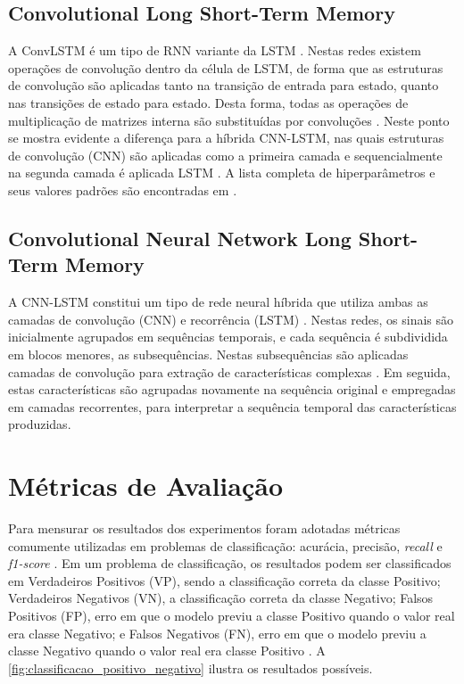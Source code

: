 \subsection{Convolutional Long Short-Term Memory}

A ConvLSTM é um tipo de RNN variante da LSTM \cite{Salman2018}. Nestas redes existem operações de convolução dentro da célula de LSTM, de forma que as estruturas de convolução são aplicadas tanto na transição de entrada para estado, quanto nas transições de estado para estado. Desta forma, todas as operações de multiplicação de matrizes interna são substituídas por convoluções \cite{Rahman2019}. Neste ponto se mostra evidente a diferença para a híbrida CNN-LSTM, nas quais estruturas de convolução (CNN) são aplicadas como a primeira camada e sequencialmente na segunda camada é aplicada LSTM \cite{Rahman2019}. A lista completa de hiperparâmetros e seus valores padrões são encontradas em .

\subsection{Convolutional Neural Network Long Short-Term Memory}

A CNN-LSTM constitui um tipo de rede neural híbrida que utiliza ambas as camadas de convolução (CNN) e recorrência (LSTM) \cite{Deep2019}. Nestas redes, os sinais são inicialmente agrupados em sequências temporais, e cada sequência é subdividida em blocos menores, as subsequências. Nestas subsequências são aplicadas camadas de convolução para extração de características complexas \cite{Deep2019}. Em seguida, estas características são agrupadas novamente na sequência original e empregadas em camadas recorrentes, para interpretar a sequência temporal das características produzidas.

\section{Métricas de Avaliação}

Para mensurar os resultados dos experimentos foram adotadas métricas comumente utilizadas em problemas de classificação: acurácia, precisão, \textit{recall} e \textit{f1-score} \cite{Rodrigues2020,Rodrigues2021,Shung2020}. Em um problema de classificação, os resultados podem ser classificados em Verdadeiros Positivos (VP), sendo a classificação correta da classe Positivo; Verdadeiros Negativos (VN), a classificação correta da classe Negativo; Falsos Positivos (FP), erro em que o modelo previu a classe Positivo quando o valor real era classe Negativo; e Falsos Negativos (FN), erro em que o modelo previu a classe Negativo quando o valor real era classe Positivo \cite{Rodrigues2020}. A \autoref{fig:classificacao_positivo_negativo} ilustra os resultados possíveis.

